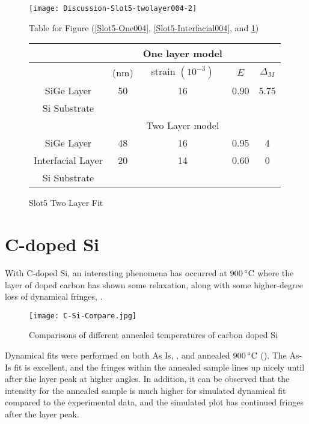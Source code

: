 \begin{figure}[hc]%
\caption{Slot5 Two Layer Fit}
\label{Slot5-2layer}
\begin{minipage}{0.85\linewidth}
\texttt{[image: Discussion-Slot5-twolayer004-2]}
\end{minipage}
\begin{minipage}{\linewidth}
\centering
\vspace{10pt}
Table for Figure (\ref{Slot5-One004}, \ref{Slot5-Interfacial004}, and \ref{Slot5-2layer})\\
\vspace{5pt}
\begin{tabular}{c|cccc}
			& 	&One layer model	 \\
\hline
			&	(nm)	&	strain	 $(10^{-3})$&	$E $ &  $\Delta_M$\\
\hline
SiGe Layer		&  	50	&      16	 & 0.90 & 5.75	\\
Si Substrate		&	\textemdash & \textemdash&\textemdash\ &\textemdash	\\
\hline
			& &Two Layer model \\
\hline
SiGe Layer		&	48	& 16	& 0.95	& 4	\\
Interfacial Layer	&	20	&14	& 0.60		& 0\\
Si Substrate		&	\textemdash & \textemdash&\textemdash\ &\textemdash
\end{tabular}
\end{minipage}
\end{figure}





\chapter{C-doped Si}

With C-doped Si, an interesting phenomena has occurred at $900\,^{\circ}\mathrm{C} $ where the layer of doped carbon has shown some relaxation, along with some higher-degree loss of dynamical fringes,  .

\begin{figure}[h]
\centering
\caption{Comparisons of different annealed temperatures of carbon doped Si}
\label{C-si-compare}
\texttt{[image: C-Si-Compare.jpg]}
\end{figure}

Dynamical fits were performed on both As Is, , and  annealed $900\,^{\circ}\mathrm{C}$ ().  The As-Is fit is excellent, and the fringes within the annealed sample lines up nicely until after the layer peak at higher angles.  In addition, it can be observed that the intensity for the annealed sample is much higher for simulated dynamical fit compared to the experimental data, and the simulated plot has continued fringes after the layer peak.

